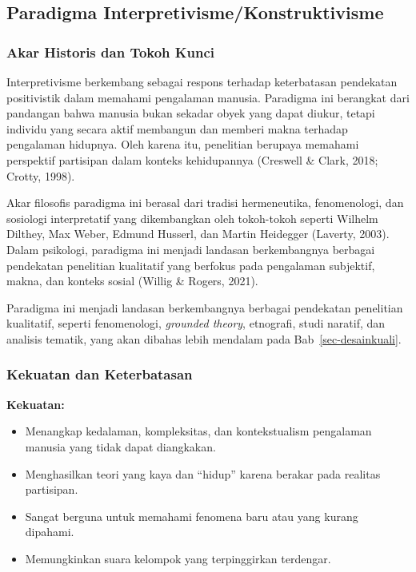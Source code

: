 \documentclass[
  indonesian,
  letterpaper,
  DIV=11,
  numbers=noendperiod]{scrreprt}
\providecommand{\tightlist}{%
  \setlength{\itemsep}{0pt}\setlength{\parskip}{0pt}}
\begin{document}
\subsection{Paradigma
Interpretivisme/Konstruktivisme}\label{paradigma-interpretivismekonstruktivisme}

\subsubsection{Akar Historis dan Tokoh
Kunci}\label{akar-historis-dan-tokoh-kunci-2}

Interpretivisme berkembang sebagai respons terhadap keterbatasan
pendekatan positivistik dalam memahami pengalaman manusia. Paradigma ini
berangkat dari pandangan bahwa manusia bukan sekadar obyek yang dapat
diukur, tetapi individu yang secara aktif membangun dan memberi makna
terhadap pengalaman hidupnya. Oleh karena itu, penelitian berupaya
memahami perspektif partisipan dalam konteks kehidupannya (Creswell \&
Clark, 2018; Crotty, 1998).

Akar filosofis paradigma ini berasal dari tradisi hermeneutika,
fenomenologi, dan sosiologi interpretatif yang dikembangkan oleh
tokoh-tokoh seperti Wilhelm Dilthey, Max Weber, Edmund Husserl, dan
Martin Heidegger (Laverty, 2003). Dalam psikologi, paradigma ini menjadi
landasan berkembangnya berbagai pendekatan penelitian kualitatif yang
berfokus pada pengalaman subjektif, makna, dan konteks sosial (Willig \&
Rogers, 2021).

Paradigma ini menjadi landasan berkembangnya berbagai pendekatan
penelitian kualitatif, seperti fenomenologi, \emph{grounded theory},
etnografi, studi naratif, dan analisis tematik, yang akan dibahas lebih
mendalam pada Bab~\ref{sec-desainkuali}.

\subsubsection{Kekuatan dan
Keterbatasan}\label{kekuatan-dan-keterbatasan-2}

\textbf{Kekuatan:}

\begin{itemize}
\tightlist
\item
  Menangkap kedalaman, kompleksitas, dan kontekstualism pengalaman
  manusia yang tidak dapat diangkakan.
\item
  Menghasilkan teori yang kaya dan ``hidup'' karena berakar pada
  realitas partisipan.
\item
  Sangat berguna untuk memahami fenomena baru atau yang kurang dipahami.
\item
  Memungkinkan suara kelompok yang terpinggirkan terdengar.
\end{itemize}
\end{document}
